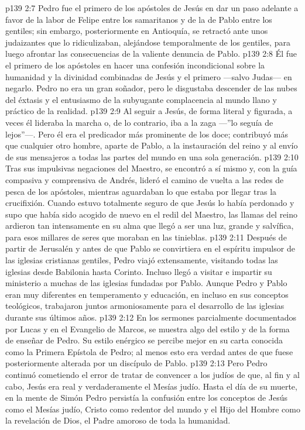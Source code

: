 \vs p139 2:7 Pedro fue el primero de los apóstoles de Jesús en dar un paso adelante a favor de la labor de Felipe entre los samaritanos y de la de Pablo entre los gentiles; sin embargo, posteriormente en Antioquía, se retractó ante unos judaizantes que lo ridiculizaban, alejándose temporalmente de los gentiles, para luego afrontar las consecuencias de la valiente denuncia de Pablo.
\vs p139 2:8 Él fue el primero de los apóstoles en hacer una confesión incondicional sobre la humanidad y la divinidad combinadas de Jesús y el primero ---salvo Judas--- en negarlo. Pedro no era un gran soñador, pero le disgustaba descender de las nubes del éxtasis y el entusiasmo de la subyugante complacencia al mundo llano y práctico de la realidad.
\vs p139 2:9 Al seguir a Jesús, de forma literal y figurada, a veces él lideraba la marcha o, de lo contrario, iba a la zaga ---”lo seguía de lejos”---. Pero él era el predicador más prominente de los doce; contribuyó más que cualquier otro hombre, aparte de Pablo, a la instauración del reino y al envío de sus mensajeros a todas las partes del mundo en una sola generación.
\vs p139 2:10 Tras sus impulsivas negaciones del Maestro, se encontró a sí mismo y, con la guía compasiva y comprensiva de Andrés, lideró el camino de vuelta a las redes de pesca de los apóstoles, mientras aguardaban lo que estaba por llegar tras la crucifixión. Cuando estuvo totalmente seguro de que Jesús lo había perdonado y supo que había sido acogido de nuevo en el redil del Maestro, las llamas del reino ardieron tan intensamente en su alma que llegó a ser una luz, grande y salvífica, para esos millares de seres que moraban en las tinieblas.
\vs p139 2:11 \pc Después de partir de Jerusalén y antes de que Pablo se convirtiera en el espíritu impulsor de las iglesias cristianas gentiles, Pedro viajó extensamente, visitando todas las iglesias desde Babilonia hasta Corinto. Incluso llegó a visitar e impartir su ministerio a muchas de las iglesias fundadas por Pablo. Aunque Pedro y Pablo eran muy diferentes en temperamento y educación, en incluso en sus conceptos teológicos, trabajaron juntos armoniosamente para el desarrollo de las iglesias durante sus últimos años.
\vs p139 2:12 \pc En los sermones parcialmente documentados por Lucas y en el Evangelio de Marcos, se muestra algo del estilo y de la forma de enseñar de Pedro. Su estilo enérgico se percibe mejor en su carta conocida como la Primera Epístola de Pedro; al menos esto era verdad antes de que fuese posteriormente alterada por un discípulo de Pablo.
\vs p139 2:13 Pero Pedro continuó cometiendo el error de tratar de convencer a los judíos de que, al fin y al cabo, Jesús era real y verdaderamente el Mesías judío. Hasta el día de su muerte, en la mente de Simón Pedro persistía la confusión entre los conceptos de Jesús como el Mesías judío, Cristo como redentor del mundo y el Hijo del Hombre como la revelación de Dios, el Padre amoroso de toda la humanidad.
